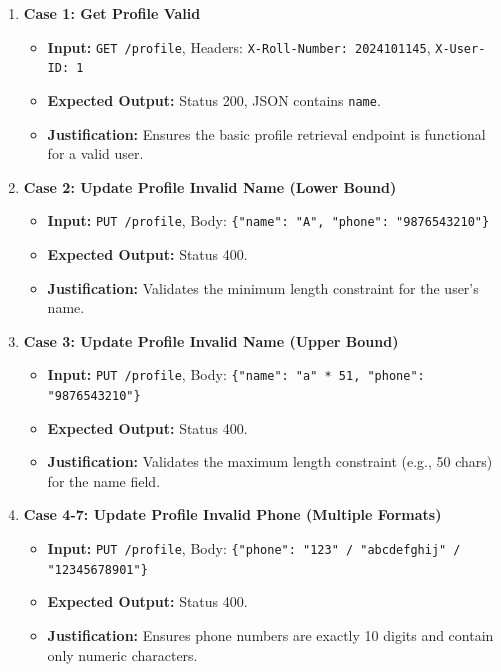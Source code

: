 \documentclass{article}
\begin{document}
\begin{enumerate}
    \item \textbf{Case 1: Get Profile Valid}
    \begin{itemize}
        \item \textbf{Input:} \texttt{GET /profile}, Headers: \texttt{X-Roll-Number: 2024101145}, \texttt{X-User-ID: 1}
        \item \textbf{Expected Output:} Status 200, JSON contains \texttt{name}.
        \item \textbf{Justification:} Ensures the basic profile retrieval endpoint is functional for a valid user.
    \end{itemize}

    \item \textbf{Case 2: Update Profile Invalid Name (Lower Bound)}
    \begin{itemize}
        \item \textbf{Input:} \texttt{PUT /profile}, Body: \texttt{\{"name": "A", "phone": "9876543210"\}}
        \item \textbf{Expected Output:} Status 400.
        \item \textbf{Justification:} Validates the minimum length constraint for the user's name.
    \end{itemize}

    \item \textbf{Case 3: Update Profile Invalid Name (Upper Bound)}
    \begin{itemize}
        \item \textbf{Input:} \texttt{PUT /profile}, Body: \texttt{\{"name": "a" * 51, "phone": "9876543210"\}}
        \item \textbf{Expected Output:} Status 400.
        \item \textbf{Justification:} Validates the maximum length constraint (e.g., 50 chars) for the name field.
    \end{itemize}

    \item \textbf{Case 4-7: Update Profile Invalid Phone (Multiple Formats)}
    \begin{itemize}
        \item \textbf{Input:} \texttt{PUT /profile}, Body: \texttt{\{"phone": "123" / "abcdefghij" / "12345678901"\}}
        \item \textbf{Expected Output:} Status 400.
        \item \textbf{Justification:} Ensures phone numbers are exactly 10 digits and contain only numeric characters.
    \end{itemize}


\end{enumerate}
\end{document}
